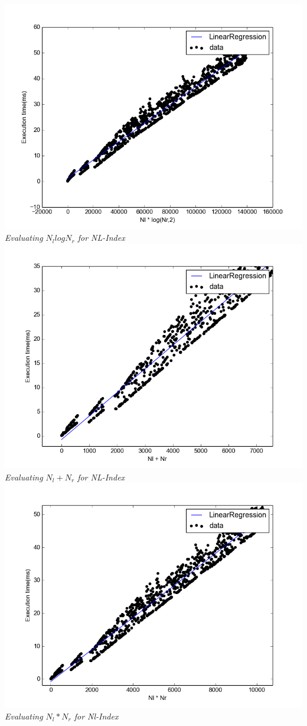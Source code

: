 \documentclass{article}
\begin{document}
\begin{multicols}{2}
	
	\begin{center}
	\includegraphics[scale=0.37]{Plots/nil-nlnrlog2.png}	
	\textit{\small Evaluating $N_{l} log N_{r}$ for NL-Index}
	\includegraphics[scale=0.37]{Plots/nil-nl+nr.png}	
	\textit{\small Evaluating $N_{l} + N_{r}$ for NL-Index}
	\includegraphics[scale=0.37]{Plots/nil-nlnr.png}	
	\textit{\small Evaluating $N_{l} * N_{r}$ for Nl-Index}
	\end{center}
	

\end{multicols}
\end{document}
